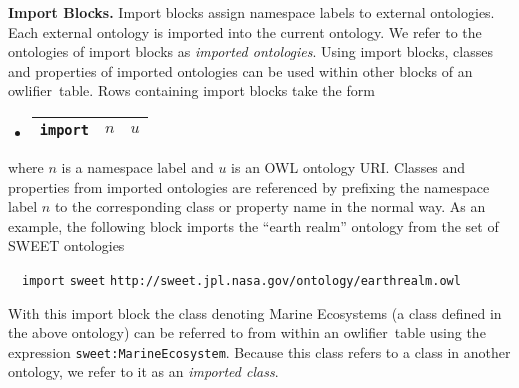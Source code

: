 \documentclass[preprint,number]{elsarticle}
\newcommand{\owlifier}{\textsf{owlifier}}
\newcommand{\myblock}[1]{\vspace{12pt}\noindent\textbf{#1}}
\begin{document}
\myblock{Import Blocks.} Import blocks assign namespace labels to
external ontologies. Each external ontology is imported into the
current ontology. We refer to the ontologies of import blocks as
\emph{imported ontologies}.  Using import blocks, classes and
properties of imported ontologies can be used within other blocks of
an \owlifier\ table.  Rows containing import blocks take the form
\begin{itemize}
\item[]
  \begin{tabular}{|l|l|l|}\hline
    \texttt{import} & $n$ & $u$ \\ \hline 
  \end{tabular} 
\end{itemize}
where $n$ is a namespace label and $u$ is an OWL ontology URI. Classes
and properties from imported ontologies are referenced by prefixing
the namespace label $n$ to the corresponding class or property name in
the normal way. As an example, the following block imports the ``earth
realm'' ontology from the set of SWEET ontologies
\cite{raskin:_seman_web_for_earth_and}
\begin{tabbing}
  ~~\texttt{import}  \texttt{sweet} 
  \texttt{http://sweet.jpl.nasa.gov/ontology/earthrealm.owl}
\end{tabbing}
With this import block the class denoting Marine Ecosystems (a class
defined in the above ontology) can be referred to from within an
\owlifier\ table using the expression
\texttt{sweet:MarineEcosystem}. Because this class refers to a class
in another ontology, we refer to it as an \emph{imported class}.
\end{document}
